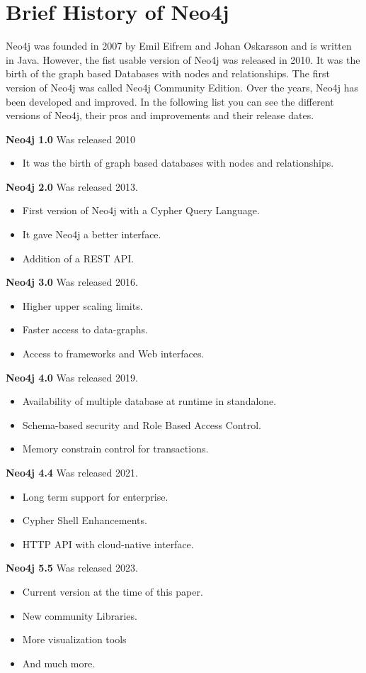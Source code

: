 
\section{Brief History of Neo4j} \label{sec:history}
Neo4j was founded in 2007 by Emil Eifrem and Johan Oskarsson and is written in Java.
However, the fist usable version of Neo4j was released in 2010.
It was the birth of the graph based Databases with nodes and relationships.
The first version of Neo4j was called Neo4j Community Edition.
Over the years, Neo4j has been developed and improved.
In the following list you can see the different versions of Neo4j, their pros and improvements and their release dates.

\textbf{Neo4j 1.0} Was released 2010
\begin{itemize}
    \item It was the birth of graph based databases with nodes and relationships.
\end{itemize}
\textbf{Neo4j 2.0} Was released 2013.
\begin{itemize}
    \item First version of Neo4j with a Cypher Query Language.
    \item It gave Neo4j a better interface.
    \item Addition of a REST API.
\end{itemize}
\textbf{Neo4j 3.0} Was released 2016.
\begin{itemize}
    \item Higher upper scaling limits.
    \item Faster access to data-graphs.
    \item Access to frameworks and Web interfaces.
\end{itemize}
\textbf{Neo4j 4.0} Was released 2019.
\begin{itemize}
    \item Availability of multiple database at runtime in standalone.
    \item Schema-based security and Role Based Access Control.
    \item Memory constrain control for transactions.
\end{itemize}
\textbf{Neo4j 4.4} Was released 2021.
\begin{itemize}
    \item Long term support for enterprise.
    \item Cypher Shell Enhancements.
    \item HTTP API with cloud-native interface.
\end{itemize}
\textbf{Neo4j 5.5} Was released 2023.
\begin{itemize}
    \item Current version at the time of this paper.
    \item New community Libraries.
    \item More visualization tools
    \item And much more.
\end{itemize}
